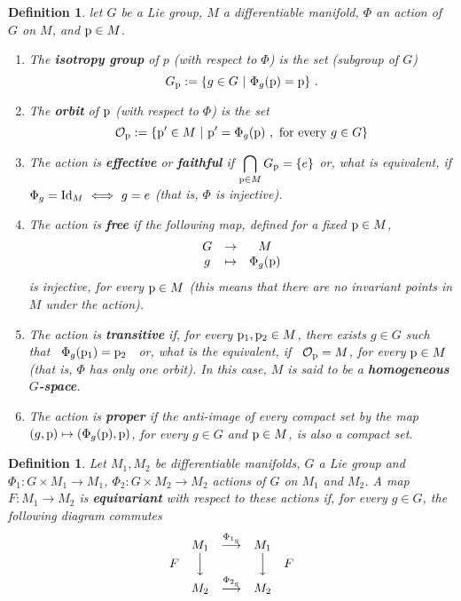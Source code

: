 \documentclass[12pt]{report}
\newtheorem{definition}[teor]{Definition}
\def\dst{\displaystyle}
\def\mapping#1{\mathrel{\mathop{\longrightarrow}\limits^{#1}}}
\begin{document}
\begin{definition}
let $G$ be a Lie group, $M$ a differentiable manifold,
$\Phi$ an action of $G$ on $M$, and ${\rm p}\in M$.
\begin{enumerate}
\item
The \textbf{isotropy group} of $p$  (with respect to $\Phi$) is the set (subgroup of $G$)
$$
G_{\rm p}:= \{ g \in G \ | \ \Phi_g({\rm p})={\rm p} \} \ .
$$
\item
The \textbf{orbit} of ${\rm p}$ (with respect to $\Phi$) is the set
$$
{\cal O}_{\rm p}:= \{{\rm p}' \in M \ | \ {\rm p}' = \Phi_g({\rm p}) \ , \ \mbox{\rm for every $g \in G$} \}
$$
\item
The action is \textbf{effective} or \textbf{faithful}
if $\dst\bigcap_{{\rm p} \in M}G_{\rm p}=\{ e \}$
or, what is equivalent, if
$\Phi_g = {\rm Id}_M \ \Longleftrightarrow \ g=e$
(that is, $\Phi$ is injective).
\item
The action is \textbf{free} if the following map, defined for a fixed ${\rm p}\in M$,
$$
\begin{array}{ccc}
G&\to&M
\\
g&\mapsto&\Phi_g({\rm p})
\end{array}
$$
is injective, for every ${\rm p}\in M$
(this means that there are no invariant points in $M$ under the action).
\item
The action is  \textbf{transitive} if, for every ${\rm p}_1,{\rm p}_2\in M$, 
there exists $g \in G$ such that \ $\Phi_g({\rm p}_1)={\rm p}_2$ \ 
or, what is the equivalent, if \
${\cal O}_{\rm p}=M$, for every ${\rm p}\in M$
(that is, $\Phi$ has only one orbit).
In this case, $M$ is said to be a \textbf{homogeneous $G$-space}.
\item
The action is \textbf{proper} if the anti-image of every  compact set by the map
$(g,{\rm p}) \mapsto (\Phi_g({\rm p}),{\rm p})$, for every $g\in G$ and ${\rm p}\in M$,
is also a compact set.
\end{enumerate}
\end{definition}

\begin{definition}
Let $M_1,M_2$ be differentiable manifolds,
$G$ a Lie group and
$\Phi_1 \colon G\times M_1 \to M_1$, $\Phi_2 \colon G\times M_2 \to M_2$ 
actions of $G$ on $M_1$ and $M_2$.
A map $F \colon M_1 \to M_2$ is \textbf{equivariant}
with respect to these actions if, for every $g\in G$, the following diagram commutes
$$
\begin{array}{ccccc}
& M_1 & \mapping{\Phi_{1_g}} & M_1 &
\\
F & \Big\downarrow & & \Big\downarrow & F
\\
& M_2 & \mapping{\Phi_{2_g}} & M_2 &
\end{array}
$$
\end{definition}
\end{document}
